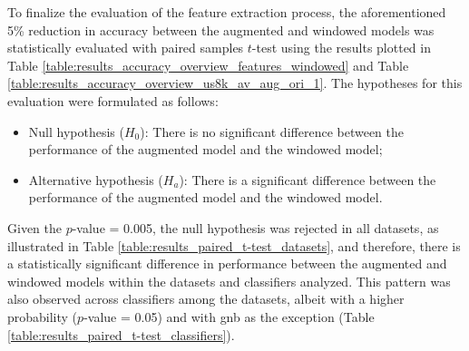 
To finalize the evaluation of the feature extraction process, the aforementioned 5\% reduction in accuracy between the augmented and windowed models was statistically evaluated with paired samples $t$-test using the results plotted in Table \ref{table:results_accuracy_overview_features_windowed} and Table \ref{table:results_accuracy_overview_us8k_av_aug_ori_1}. The hypotheses for this evaluation were formulated as follows:

\begin{itemize}
    \item Null hypothesis ($H_0$): There is no significant difference between the performance of the augmented model and the windowed model;
    \item Alternative hypothesis ($H_a$): There is a significant difference between the performance of the augmented model and the windowed model.
\end{itemize}

Given the $p$-value = 0.005, the null hypothesis was rejected in all datasets, as illustrated in Table \ref{table:results_paired_t-test_datasets}, and therefore, there is a statistically significant difference in performance between the augmented and windowed models within the datasets and classifiers analyzed. This pattern was also observed across classifiers among the datasets, albeit with a higher probability ($p$-value = 0.05) and with \gls{gnb} as the exception (Table \ref{table:results_paired_t-test_classifiers}).


